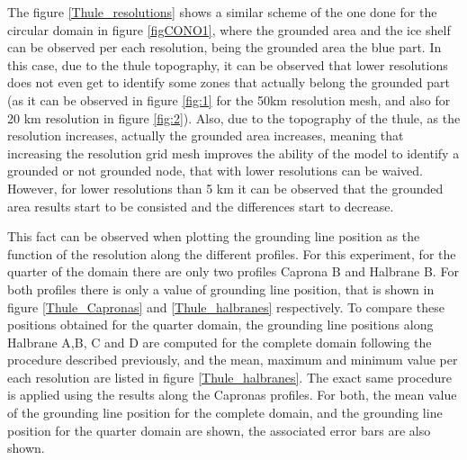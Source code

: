 \documentclass{article}
\begin{document}
The figure \ref{Thule_resolutions} shows a similar scheme of the one done for the circular domain in figure \ref{figCONO1}, where the grounded area and the ice shelf can be observed per each resolution, being the grounded area the blue part. In this case, due to the thule topography, it can be observed that lower resolutions does not even get to identify some zones that actually belong the grounded part (as it can be observed in figure \ref{fig:1} for the 50km resolution mesh, and also for 20 km resolution in figure \ref{fig:2}). Also, due to the topography of the thule, as the resolution increases, actually the grounded area increases, meaning that increasing the resolution grid mesh improves the ability of the model to identify a grounded or not grounded node, that with lower resolutions can be waived. However, for lower resolutions than 5 km it can be observed that the grounded area results start to be consisted and the differences start to decrease.

This fact can be observed when plotting the grounding line position as the function of the resolution along the different profiles. For this experiment, for the quarter of the domain there are only two profiles Caprona B and Halbrane B. For both profiles there is only a value of grounding line position, that is shown in figure \ref{Thule_Capronas} and \ref{Thule_halbranes} respectively. To compare these positions obtained for the quarter domain, the grounding line positions along Halbrane A,B, C and D are computed for the complete domain following the procedure described previously, and the mean, maximum and minimum value per each resolution are listed in figure \ref{Thule_halbranes}. The exact same procedure is applied using the results along the Capronas profiles. For both, the mean value of the grounding line position for the complete domain, and the grounding line position for the quarter domain are shown, the associated error bars are also shown.
\end{document}
